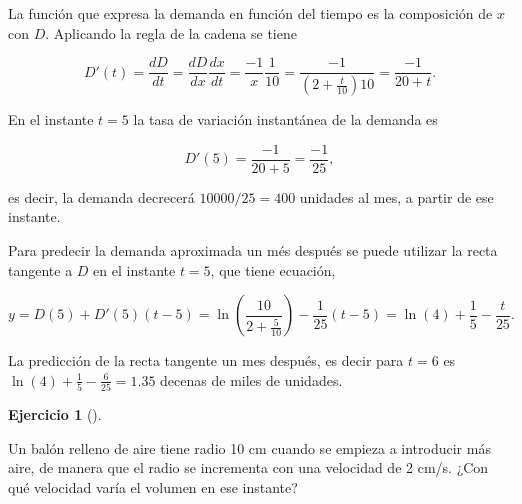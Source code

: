 \documentclass[
  spanish,
  a4paper,
]{scrreport}
\theoremstyle{definition}
\newtheorem{exercise}{Ejercicio}[chapter]
\theoremstyle{remark}
\begin{document}
\begin{tcolorbox}[enhanced jigsaw, arc=.35mm, bottomrule=.15mm, bottomtitle=1mm, breakable, colback=white, colbacktitle=quarto-callout-tip-color!10!white, colframe=quarto-callout-tip-color-frame, coltitle=black, left=2mm, leftrule=.75mm, opacityback=0, opacitybacktitle=0.6, rightrule=.15mm, title=\textcolor{quarto-callout-tip-color}{\faLightbulb}\hspace{0.5em}{Solución}, titlerule=0mm, toprule=.15mm, toptitle=1mm]

La función que expresa la demanda en función del tiempo es la
composición de \(x\) con \(D\). Aplicando la regla de la cadena se tiene

\[
D'(t) = \frac{dD}{dt} = \frac{dD}{dx}\frac{dx}{dt} = \frac{-1}{x}\frac{1}{10} =\frac{-1}{(2+\frac{t}{10})10} = \frac{-1}{20+t}.
\]

En el instante \(t=5\) la tasa de variación instantánea de la demanda es

\[
D'(5) = \frac{-1}{20+5} = \frac{-1}{25},
\]

es decir, la demanda decrecerá \(10000/25=400\) unidades al mes, a
partir de ese instante.

Para predecir la demanda aproximada un més después se puede utilizar la
recta tangente a \(D\) en el instante \(t=5\), que tiene ecuación,

\[
y = D(5)+D'(5)(t-5) = \ln\left(\frac{10}{2+\frac{5}{10}}\right) -\frac{1}{25}(t-5) = \ln(4)+\frac{1}{5}-\frac{t}{25}.
\]

La predicción de la recta tangente un mes después, es decir para \(t=6\)
es \(\ln(4)+\frac{1}{5}-\frac{6}{25}=1.35\) decenas de miles de
unidades.

\end{tcolorbox}

\begin{exercise}[]\protect\hypertarget{exr-regla-cadena-2}{}\label{exr-regla-cadena-2}

Un balón relleno de aire tiene radio 10 cm cuando se empieza a
introducir más aire, de manera que el radio se incrementa con una
velocidad de 2 cm/s. ¿Con qué velocidad varía el volumen en ese
instante?

\end{exercise}
\end{document}
